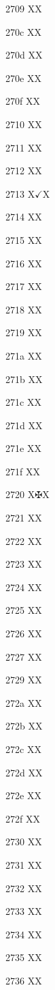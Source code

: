 \documentclass[11pt]{article}
\begin{document}
2709 X{}X

270c X{}X

270d X{}X

270e X{}X

270f X{}X

2710 X{}X

2711 X{}X

2712 X{}X

2713 X{\ensuremath{\checkmark}}X

2714 X{}X

2715 X{}X

2716 X{}X

2717 X{}X

2718 X{}X

2719 X{}X

271a X{}X

271b X{}X

271c X{}X

271d X{}X

271e X{}X

271f X{}X

2720 X{\ensuremath{\maltese}}X

2721 X{}X

2722 X{}X

2723 X{}X

2724 X{}X

2725 X{}X

2726 X{}X

2727 X{}X

2729 X{}X

272a X{}X

272b X{}X

272c X{}X

272d X{}X

272e X{}X

272f X{}X

2730 X{}X

2731 X{}X

2732 X{}X

2733 X{}X

2734 X{}X

2735 X{}X

2736 X{}X
\end{document}
